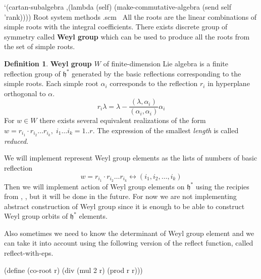 \documentclass[a4paper,10pt]{article}%
\theoremstyle{definition} \newtheorem{Def}{Definition}
\begin{document}
`(cartan-subalgebra ,(lambda (self)
    (make-commutative-algebra (send self 'rank))))
\LA{}Root system methods .scm~{\nwtagstyle{}}\RA{}
\nwendcode{}\nwdocspar
All the roots are the linear combinations of simple roots with the integral coefficients. There exists discrete group of symmetry called {\bf Weyl group} which can be used to produce all the roots from the set of simple roots. 
\begin{Def}
  \label{weyl-group-def}
  {\bf Weyl group $W$} of finite-dimension Lie algebra is a finite reflection group of $\mathfrak{h}^*$ generated by the basic reflections corresponding to the simple roots. 
  Each simple root $\alpha_i$ corresponds to the reflection $r_{i}$ in hyperplane orthogonal to $\alpha$.
  \begin{equation}
    \label{eq:5}
    r_{i}\lambda=\lambda-\frac{(\lambda,\alpha_i)}{(\alpha_i,\alpha_i)}\alpha_i
  \end{equation}
  For $w\in W$ there exists several equivalent realizations of the form $w=r_{i_1}\cdot r_{i_2}\dots r_{i_k},\; i_1\dots i_k=1..r$. The expression of the smallest {\it length} is called {\it reduced}. 
\end{Def}
We will implement represent Weyl group elements as the lists of numbers of basic reflection
\begin{equation}
  \label{eq:6}
  w=r_{i_1}\cdot r_{i_2}\dots r_{i_k} \leftrightarrow (i_1, i_2,\dots,i_k)
\end{equation}
Then we will implement action of Weyl group elements on $\mathfrak{h}^*$ using the recipies from \cite{stembridge2001computational}, \cite{casselman1994machine}, but it will be done in the future. For now we are not implementing abstract construction of Weyl group since it is enough to be able to construct Weyl group orbits of $\mathfrak{h}^*$ elements.

Also sometimes we need to know the determinant of Weyl group element and we can take it into account using the following version of the {\Tt{}reflect\nwendquote} function, called {\Tt{}reflect-with-eps\nwendquote}.

\nwenddocs{}\endmoddef\nwstartdeflinemarkup{}\nwenddeflinemarkup
(define (co-root r)
  (div (mul 2 r) (prod r r)))
\end{document}
